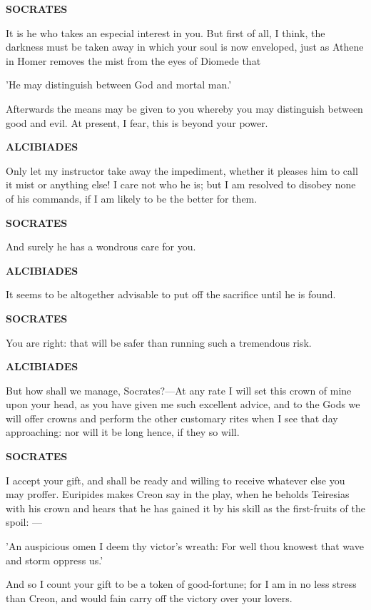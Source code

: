 \documentclass[11pt,letter]{article}
\begin{document}
\par \textbf{SOCRATES}
\par   It is he who takes an especial interest in you. But first of all, I think, the darkness must be taken away in which your soul is now enveloped, just as Athene in Homer removes the mist from the eyes of Diomede that

\par  'He may distinguish between God and mortal man.'

\par  Afterwards the means may be given to you whereby you may distinguish between good and evil. At present, I fear, this is beyond your power.

\par \textbf{ALCIBIADES}
\par   Only let my instructor take away the impediment, whether it pleases him to call it mist or anything else! I care not who he is; but I am resolved to disobey none of his commands, if I am likely to be the better for them.

\par \textbf{SOCRATES}
\par   And surely he has a wondrous care for you.

\par \textbf{ALCIBIADES}
\par   It seems to be altogether advisable to put off the sacrifice until he is found.

\par \textbf{SOCRATES}
\par   You are right:  that will be safer than running such a tremendous risk.

\par \textbf{ALCIBIADES}
\par   But how shall we manage, Socrates?—At any rate I will set this crown of mine upon your head, as you have given me such excellent advice, and to the Gods we will offer crowns and perform the other customary rites when I see that day approaching:  nor will it be long hence, if they so will.

\par \textbf{SOCRATES}
\par   I accept your gift, and shall be ready and willing to receive whatever else you may proffer. Euripides makes Creon say in the play, when he beholds Teiresias with his crown and hears that he has gained it by his skill as the first-fruits of the spoil: —

\par  'An auspicious omen I deem thy victor's wreath: For well thou knowest that wave and storm oppress us.'

\par  And so I count your gift to be a token of good-fortune; for I am in no less stress than Creon, and would fain carry off the victory over your lovers.

\par 
 
\end{document}
